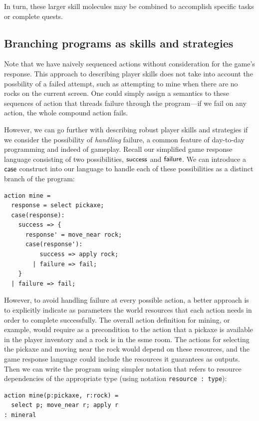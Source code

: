 In turn, these larger skill molecules may be combined to accomplish
specific tasks or complete quests.

\subsection{Branching programs as skills and strategies}

Note that we have naively sequenced actions without consideration for the
game's response. This approach to describing player skills does not take
into account the possbility of a failed attempt, such as attempting to mine
when there are no rocks on the current screen. One could simply assign a
semantics to these sequences of action that threads failure through the
program---if we fail on any action, the whole compound action fails.

However, we can go further with describing robust player skills and
strategies if we consider the possibility of {\em handling} failure, a
common feature of day-to-day programming and indeed of gameplay. Recall our
simplified game response language consisting of two possibilities,
$\mathsf{success}$ and $\mathsf{failure}$. We can introduce a $\mathsf{case}$
construct into our language to handle each of these possibilities as a
distinct branch of the program:

\begin{verbatim}
action mine = 
  response = select pickaxe;
  case(response):
    success => {
      response' = move_near rock;
      case(response'):
          success => apply rock;
        | failure => fail;
    }
  | failure => fail;
\end{verbatim}

However, to avoid handling failure at every possible action, a better
approach is to explicitly indicate as parameters the world resources that
each action needs in order to complete successfully.
The overall action definition for mining, or example, would
require as a precondition to the action that a pickaxe is
available in the player inventory and a rock is in the ssme room. The
actions for selecting the pickaxe and moving near the rock would depend on
these resources, and the game response language could include the resources
it guarantees as outputs. Then we can write the program using simpler
notation that refers to resource dependencies of the appropriate type
(using notation \verb|resource : type|):

\begin{verbatim}
action mine(p:pickaxe, r:rock) = 
  select p; move_near r; apply r
: mineral
\end{verbatim}


